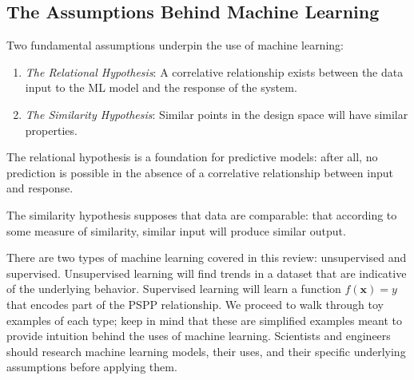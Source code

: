 \subsection{The Assumptions Behind Machine Learning}
Two fundamental assumptions underpin the use of machine learning:
\begin{enumerate}
\item \textit{The Relational Hypothesis}: A correlative relationship exists between the data input to the ML model and the response of the system.
\item \textit{The Similarity Hypothesis}: Similar points in the design space will have similar properties.
\end{enumerate}


The relational hypothesis is a foundation for predictive models: after all, no prediction is possible in the absence of a correlative relationship between input and response.
 
The similarity hypothesis supposes that data are comparable: that according to some measure of similarity, similar input will produce similar output. 

There are two types of machine learning covered in this review: unsupervised and supervised. Unsupervised learning will find trends in a dataset that are indicative of the underlying behavior. Supervised learning will learn a function $f(\mathbf{x}) = y$ that encodes part of the PSPP relationship. We proceed to walk through toy examples of each type; keep in mind that these are simplified examples meant to provide intuition behind the uses of machine learning. Scientists and engineers should research machine learning models, their uses, and their specific underlying assumptions before applying them.

